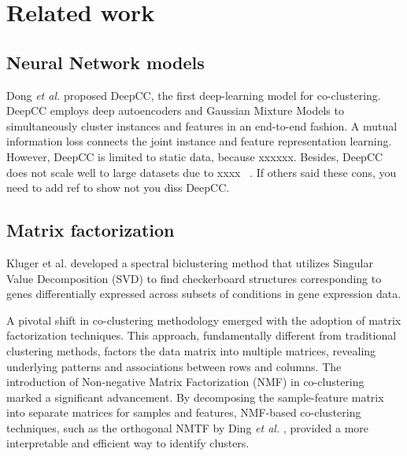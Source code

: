 

\section{Related work}
\subsection{Neural Network models}
Dong \textit{et al.}\cite{dongkuanxu2019DeepCoClustering} proposed DeepCC, the first deep-learning model for co-clustering. DeepCC employs deep autoencoders and Gaussian Mixture Models to simultaneously cluster instances and features in an end-to-end fashion. A mutual information loss connects the joint instance and feature representation learning. {\color{blue} However, DeepCC is limited to static data, because xxxxxx. Besides, DeepCC does not scale well to large datasets due to xxxx ~\cite{}.
If others said these cons, you need to add ref to show not you diss DeepCC}. 

\subsection{Matrix factorization}
Kluger et al. \cite{kluger2003SpectralBiclusteringMicroarray} developed a spectral biclustering method that utilizes Singular Value Decomposition (SVD) to find checkerboard structures corresponding to genes differentially expressed across subsets of conditions in gene expression data.   

A pivotal shift in co-clustering methodology emerged with the adoption of matrix factorization techniques. This approach, fundamentally different from traditional clustering methods, factors the data matrix into multiple matrices, revealing underlying patterns and associations between rows and columns. The introduction of Non-negative Matrix Factorization (NMF) in co-clustering marked a significant advancement. By decomposing the sample-feature matrix into separate matrices for samples and features, NMF-based co-clustering techniques, such as the orthogonal NMTF by Ding \textit{et al.} \cite{ding2006OrthogonalNonnegativeMatrix}, provided a more interpretable and efficient way to identify clusters. 

